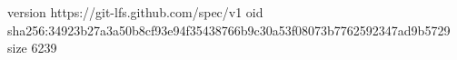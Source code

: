version https://git-lfs.github.com/spec/v1
oid sha256:34923b27a3a50b8cf93e94f35438766b9c30a53f08073b7762592347ad9b5729
size 6239
